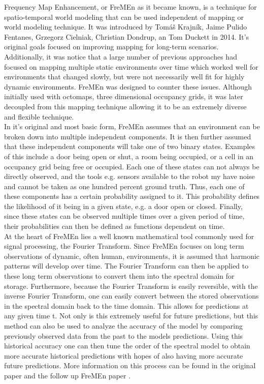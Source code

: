   Frequency Map Enhancement, or FreMEn as it became known, is a technique for
  spatio-temporal world modeling that can be used independent of mapping or
  world modeling technique. It was introduced by Tomáš Krajník, Jaime Pulido
  Fentanes, Grzegorz Cielniak, Christian Dondrup, an Tom Duckett in 2014. It's
  original goals focused on improving mapping for long-term scenarios.
  Additionally, it was notice that a large number of previous approaches had
  focused on mapping multiple static environments over time which worked well
  for environments that changed slowly, but were not necessarily well fit for
  highly dynamic environments. FreMEn was designed to counter these issues.
  \cite{Fentanes2014} Although initially used with octomaps, three dimensional
  occupancy grids, it was later decoupled from this mapping technique allowing
  it to be an extremely diverse and flexible technique. \\

  In it's original and most basic form, FreMEn assumes that an environment can be
  broken down into multiple independent components. It is then further assumed
  that these independent components will take one of two binary states. Examples
  of this include a door being open or shut, a room being occupied, or a cell in
  an occupancy grid being free or occupied. Each one of these states can not
  always be directly observed, and the tools e.g. sensors available to the robot
  my have noise and cannot be taken as one hundred percent ground truth. Thus,
  each one of these components has a certain probability assigned to it. This
  probability defines the likelihood of it being in a given state, e.g. a door
  open or closed.  Finally, since these states can be observed multiple times
  over a given period of time, their probabilities can then be defined as
  functions dependent on time. \\

  At the heart of FreMEn lies a well known mathematical tool commonly used for
  signal processing, the Fourier Transform. Since FreMEn focuses on long term
  observations of dynamic, often human, environments, it is assumed that harmonic
  patterns will develop over time. The Fourier Transform can then be applied to
  these long term observations to convert them into the spectral domain for
  storage. Furthermore, because the Fourier Transform is easily reversible,
  with the inverse Fourier Transform, one can easily convert between the stored
  observations in the spectral domain back to the time domain. This allows for
  predictions at any given time t. Not only is this extremely useful for future
  predictions, but this method can also be used to analyze the accuracy of the
  model by comparing previously observed data from the past to the models
  predictions. Using this historical accuracy one can then tune the order of the
  spectral model to obtain more accurate historical predictions with hopes of
  also having more accurate future predictions. More information on this process
  can be found in the original paper\cite{Fentanes2014} and the follow up FreMEn
  paper \cite{Krajnik2015}. \\

